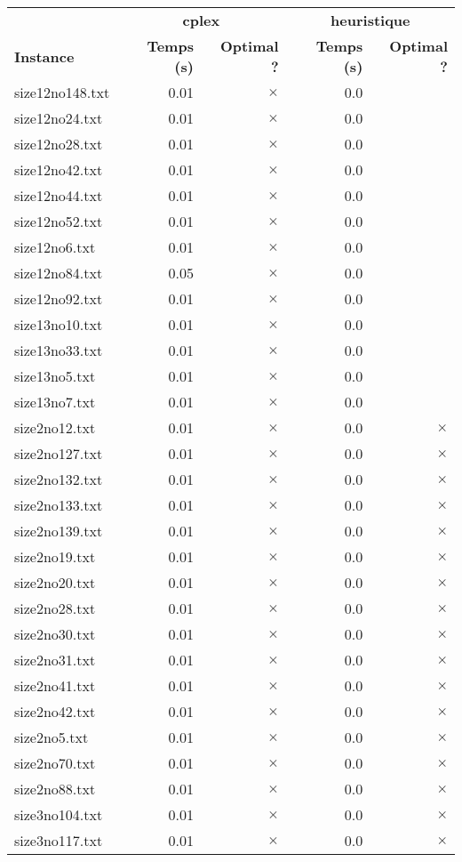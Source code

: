\documentclass{article}
\begin{document}
\newpage
\begin{center}
\renewcommand{\arraystretch}{1.4} 
 \begin{tabular}{lrrrr}
	\hline
 & \multicolumn{2}{c}{\textbf{cplex}} & \multicolumn{2}{c}{\textbf{heuristique}}\\
\textbf{Instance}  & \textbf{Temps (s)} & \textbf{Optimal ?}  & \textbf{Temps (s)} & \textbf{Optimal ?} \\\hline

size12no148.txt & 0.01 & 
$\times$
 & 0.0 & 
\\
size12no24.txt & 0.01 & 
$\times$
 & 0.0 & 
\\
size12no28.txt & 0.01 & 
$\times$
 & 0.0 & 
\\
size12no42.txt & 0.01 & 
$\times$
 & 0.0 & 
\\
size12no44.txt & 0.01 & 
$\times$
 & 0.0 & 
\\
size12no52.txt & 0.01 & 
$\times$
 & 0.0 & 
\\
size12no6.txt & 0.01 & 
$\times$
 & 0.0 & 
\\
size12no84.txt & 0.05 & 
$\times$
 & 0.0 & 
\\
size12no92.txt & 0.01 & 
$\times$
 & 0.0 & 
\\
size13no10.txt & 0.01 & 
$\times$
 & 0.0 & 
\\
size13no33.txt & 0.01 & 
$\times$
 & 0.0 & 
\\
size13no5.txt & 0.01 & 
$\times$
 & 0.0 & 
\\
size13no7.txt & 0.01 & 
$\times$
 & 0.0 & 
\\
size2no12.txt & 0.01 & 
$\times$
 & 0.0 & 
$\times$
\\
size2no127.txt & 0.01 & 
$\times$
 & 0.0 & 
$\times$
\\
size2no132.txt & 0.01 & 
$\times$
 & 0.0 & 
$\times$
\\
size2no133.txt & 0.01 & 
$\times$
 & 0.0 & 
$\times$
\\
size2no139.txt & 0.01 & 
$\times$
 & 0.0 & 
$\times$
\\
size2no19.txt & 0.01 & 
$\times$
 & 0.0 & 
$\times$
\\
size2no20.txt & 0.01 & 
$\times$
 & 0.0 & 
$\times$
\\
size2no28.txt & 0.01 & 
$\times$
 & 0.0 & 
$\times$
\\
size2no30.txt & 0.01 & 
$\times$
 & 0.0 & 
$\times$
\\
size2no31.txt & 0.01 & 
$\times$
 & 0.0 & 
$\times$
\\
size2no41.txt & 0.01 & 
$\times$
 & 0.0 & 
$\times$
\\
size2no42.txt & 0.01 & 
$\times$
 & 0.0 & 
$\times$
\\
size2no5.txt & 0.01 & 
$\times$
 & 0.0 & 
$\times$
\\
size2no70.txt & 0.01 & 
$\times$
 & 0.0 & 
$\times$
\\
size2no88.txt & 0.01 & 
$\times$
 & 0.0 & 
$\times$
\\
size3no104.txt & 0.01 & 
$\times$
 & 0.0 & 
$\times$
\\
size3no117.txt & 0.01 & 
$\times$
 & 0.0 & 
$\times$
\\
\hline\end{tabular}
\end{center}
\end{document}
